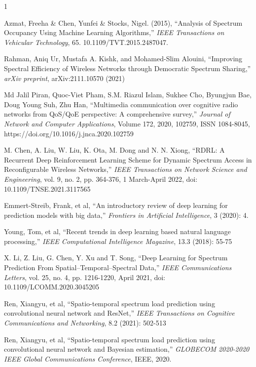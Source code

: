 \documentclass[lettersize,journal]{IEEEtran}
\begin{document}
\begin{thebibliography}{1}


Azmat, Freeha \& Chen, Yunfei \& Stocks, Nigel. (2015), ``Analysis of Spectrum Occupancy Using Machine Learning Algorithms,'' \textit{IEEE Transactions on Vehicular Technology}, 65. 10.1109/TVT.2015.2487047.

Rahman, Aniq Ur, Mustafa A. Kishk, and Mohamed-Slim Alouini, ``Improving Spectral Efficiency of Wireless Networks through Democratic Spectrum Sharing,'' \textit{arXiv preprint}, arXiv:2111.10570 (2021)

Md Jalil Piran, Quoc-Viet Pham, S.M. Riazul Islam, Sukhee Cho, Byungjun Bae, Doug Young Suh, Zhu Han, ``Multimedia communication over cognitive radio networks from QoS/QoE perspective: A comprehensive survey,'' \textit{Journal of Network and Computer Applications}, Volume 172, 2020, 102759, ISSN 1084-8045, https://doi.org/10.1016/j.jnca.2020.102759

M. Chen, A. Liu, W. Liu, K. Ota, M. Dong and N. N. Xiong, ``RDRL: A Recurrent Deep Reinforcement Learning Scheme for Dynamic Spectrum Access in Reconfigurable Wireless Networks,'' \textit{IEEE Transactions on Network Science and Engineering}, vol. 9, no. 2, pp. 364-376, 1 March-April 2022, doi: 10.1109/TNSE.2021.3117565

Emmert-Streib, Frank, et al, ``An introductory review of deep learning for prediction models with big data,'' \textit{Frontiers in Artificial Intelligence}, 3 (2020): 4.

Young, Tom, et al, ``Recent trends in deep learning based natural language processing,'' \textit{IEEE Computational Intelligence Magazine}, 13.3 (2018): 55-75

X. Li, Z. Liu, G. Chen, Y. Xu and T. Song, ``Deep Learning for Spectrum Prediction From Spatial–Temporal–Spectral Data,'' \textit{IEEE Communications Letters}, vol. 25, no. 4, pp. 1216-1220, April 2021, doi: 10.1109/LCOMM.2020.3045205

Ren, Xiangyu, et al, ``Spatio-temporal spectrum load prediction using convolutional neural network and ResNet,'' \textit{IEEE Transactions on Cognitive Communications and Networking}, 8.2 (2021): 502-513

Ren, Xiangyu, et al, ``Spatio-temporal spectrum load prediction using convolutional neural network and Bayesian estimation,'' \textit{GLOBECOM 2020-2020 IEEE Global Communications Conference}, IEEE, 2020.


\end{thebibliography}
\end{document}
